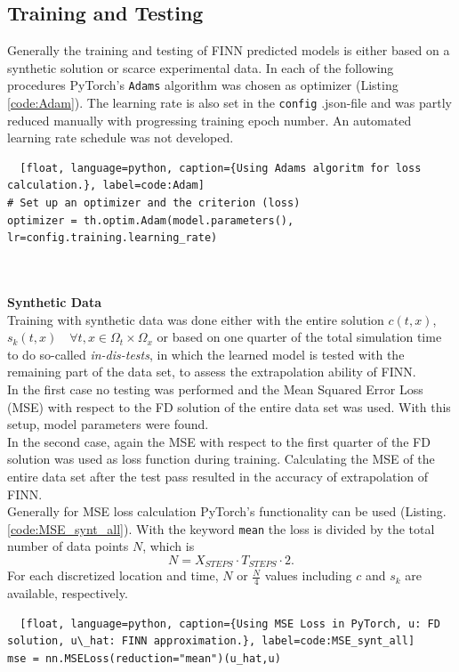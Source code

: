 \subsection{Training and Testing}
Generally the training and testing of FINN predicted models is either based on a synthetic solution or scarce experimental data. In each of the following procedures PyTorch's \texttt{Adams} algorithm \cite{Kingma2014Dec} was chosen as optimizer (Listing \ref{code:Adam}). The learning rate is also set in the \texttt{config} .json-file and was partly reduced manually with progressing training epoch number. An automated learning rate schedule was not developed.
\begin{lstlisting}  [float, language=python, caption={Using Adams algoritm for loss calculation.}, label=code:Adam]
# Set up an optimizer and the criterion (loss)
optimizer = th.optim.Adam(model.parameters(), lr=config.training.learning_rate)
\end{lstlisting}
\\
\\
\textbf{Synthetic Data}\\
Training with synthetic data was done either with the entire solution $c(t,x)$, $s_k(t,x) \quad \forall t,x \in \Omega_t \times \Omega_x$ or based on one quarter of the total simulation time to do so-called \textit{in-dis-tests}, in which the learned model is tested with the remaining part of the data set, to assess the extrapolation ability of FINN.\\
In the first case no testing was performed and the Mean Squared Error Loss (MSE) with respect to the FD solution of the entire data set was used. With this setup, model parameters were found.\\
In the second case, again the MSE with respect to the first quarter of the FD solution was used as loss function during training. Calculating the MSE of the entire data set after the test pass resulted in the accuracy of extrapolation of FINN.\\
Generally for MSE loss calculation PyTorch's functionality can be used (Listing. \ref{code:MSE_synt_all}). With the keyword \texttt{mean} the loss is divided by the total number of data points $N$, which is
\begin{equation}
    N = X_{STEPS} \cdot T_{STEPS} \cdot 2.
\end{equation}
For each discretized location and time, $N$ or $\frac{N}{4}$ values including $c$ and $s_k$ are available, respectively.
\begin{lstlisting}  [float, language=python, caption={Using MSE Loss in PyTorch, u: FD solution, u\_hat: FINN approximation.}, label=code:MSE_synt_all]
mse = nn.MSELoss(reduction="mean")(u_hat,u)
\end{lstlisting}
